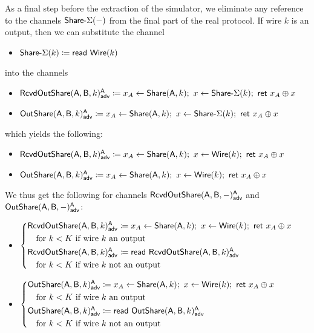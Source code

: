 As a final step before the extraction of the simulator, we eliminate any reference to the channels $\mathsf{Share}\textsf{-}\Sigma(-)$ from the final part of the real protocol. If wire $k$ is an output, then we can substitute the channel
\begin{itemize}
\item $\mathsf{Share}\textsf{-}\Sigma(k) \coloneqq \mathsf{read} \ \mathsf{Wire}(k)$
\end{itemize}
into the channels
\begin{itemize}
\item {\color{blue} $\mathsf{RcvdOutShare}(\mathsf{A},\mathsf{B},k)^{\mathsf{A}}_{\mathsf{adv}} \coloneqq x_A \leftarrow \mathsf{Share}(\mathsf{A},k); \ x \leftarrow \mathsf{Share}\textsf{-}\Sigma(k); \ \mathsf{ret} \ x_A \oplus x$}
\item {\color{blue} $\LeakOutShare(\A,\B,k)^\A_\adv \coloneqq x_A \leftarrow \Share(\A,k); \ x \leftarrow \SumShare(k); \ \ret{x_A \oplus x}$}
\end{itemize}
which yields the following:
\begin{itemize}
\item {\color{blue} $\mathsf{RcvdOutShare}(\mathsf{A},\mathsf{B},k)^{\mathsf{A}}_{\mathsf{adv}} \coloneqq x_A \leftarrow \mathsf{Share}(\mathsf{A},k); \ x \leftarrow \mathsf{Wire}(k); \ \mathsf{ret} \ x_A \oplus x$}
\item {\color{blue} $\LeakOutShare(\A,\B,k)^\A_\adv \coloneqq x_A \leftarrow \Share(\A,k); \ x \leftarrow \Wire(k); \ \ret{x_A \oplus x}$}
\end{itemize}
We thus get the following for channels $\mathsf{RcvdOutShare}(\mathsf{A},\mathsf{B},-)^{\mathsf{A}}_{\mathsf{adv}}$ and $\mathsf{OutShare}(\mathsf{A},\mathsf{B},-)^{\mathsf{A}}_{\mathsf{adv}}$:
\begin{itemize}
\item {\color{blue} $\begin{cases*} \LeakRcvdOutShare(\A,\B,k)^\A_\adv \coloneqq x_A \leftarrow \Share(\A,k); \ x \leftarrow \Wire(k); \ \ret{x_A \oplus x} \\ \hspace{10pt} \text{for $k < K$ if wire $k$ an output} \\ \LeakRcvdOutShare(\A,\B,k)^\A_\adv \coloneqq \read{\LeakRcvdOutShare(\A,\B,k)^\A_\adv} \\ \hspace{10pt} \text{for $k < K$ if wire $k$ not an output} \end{cases*}$}
\item {\color{blue} $\begin{cases*} \LeakOutShare(\A,\B,k)^\A_\adv \coloneqq x_A \leftarrow \Share(\A,k); \ x \leftarrow \Wire(k); \ \ret{x_A \oplus x} \\ \hspace{10pt} \text{for $k < K$ if wire $k$ an output} \\ \LeakOutShare(\A,\B,k)^\A_\adv \coloneqq \read{\LeakOutShare(\A,\B,k)^\A_\adv} \\ \hspace{10pt} \text{for $k < K$ if wire $k$ not an output} \end{cases*}$}
\end{itemize}
